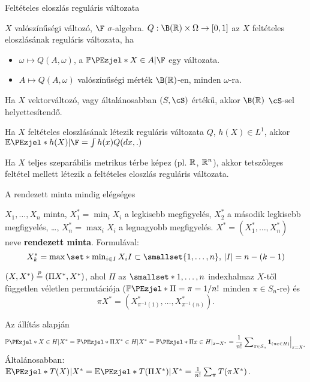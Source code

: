 \documentclass[aspectratio=169,notheorems,9pt,\option]{beamer}
\begin{document}
\begin{frame}{Feltételes eloszlás reguláris változata}
  \begin{df}
    $X$ valószínűségi változó, $\F$ $\sigma$-algebra. $Q:\B(\real)\times\Omega\to[0,1]$ az $X$ feltételes 
    eloszlásának reguláris változata, ha 
    \begin{itemize}[<*>]
      \item $\omega\mapsto Q(A,\omega)$, a $\P{X\in A|\F}$ egy változata.
      \item $A\mapsto Q(A,\omega)$ valószínűségi mérték $\B(\real)$-en, minden $\omega$-ra.  
    \end{itemize}
  \end{df}
  \continue
  Ha $X$ vektorváltozó, vagy  általánosabban $(S,\cS)$ értékű, akkor $\B(\real)$ $\cS$-sel helyettesítendő. 
  \begin{proposition}
    Ha $X$ feltételes eloszlásának létezik reguláris változata $Q$, $h(X)\in L^1$, akkor $\E{h(X)|\F}=\int h(x) Q(dx,.)$
  \end{proposition}
  
  \begin{theorem}
    Ha $X$ teljes szeparábilis metrikus térbe képez (pl. $\mathbb{R}$, $\mathbb{R}^n$), akkor tetszőleges feltétel 
    mellett létezik a feltételes eloszlás reguláris változata.
  \end{theorem}
  
\end{frame}

\begin{frame}{A rendezett minta mindig elégséges}
  \begin{df}
    $X_1,\dots,X_n$ minta, 
    $X_1^*=\min_i X_i$ a legkisebb megfigyelés,  
    $X_2^*$ a második legkisebb megfigyelés, \ldots, $X_n^*=\max_i X_i$ 
    a legnagyobb megfigyelés.
    $X^*=(X_1^*,\dots,X_n^*)$ neve \textbf{rendezett minta}. 
    Formulával:
    \begin{displaymath}
      X_k^*=\max\set*{\min\nolimits_{i\in I} X_i}{I\subset\smallset{1,\dots,n},\, \abs*{I}=n-(k-1)} 
    \end{displaymath}
  \end{df}
  \begin{proposition}
    $(X,X^*)\stackrel{p}{=}(\Pi X^*,X^*)$, ahol $\Pi$ az $\smallset*{1,\dots,n}$ indexhalmaz 
    $X$-től független véletlen permutációja ($\P{\Pi=\pi}=1/n!$ minden $\pi\in S_n$-re) és 
    \begin{displaymath}
      \pi X^*=(X^*_{\pi^{-1}(1)},\dots,X^*_{\pi^{-1}(n)}).
    \end{displaymath}
  \end{proposition}
  \continue
  Az állítás alapján
  \begin{displaymath}
    \P{X\in H|X^*}=\P{\Pi X^*\in H|X^*}=\P{\Pi x\in H}|_{x=X^*}
    =\frac1{n!}\left.\sum\nolimits_{\pi\in S_n} \I{\pi x\in H}\right|_{x=X^*}
  \end{displaymath}
  Általánosabban: $\E{T(X)|X^*}=\E{T(\Pi X^*)|X^*}=\frac1{n!}\sum_{\pi} T(\pi X^*)$.
\end{frame}
\end{document}
